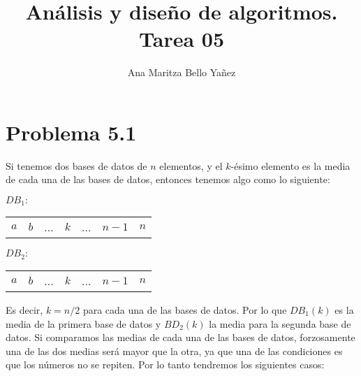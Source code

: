 \documentclass{article}
\begin{document}
\title{Análisis y diseño de algoritmos. \\ Tarea 05}
\author{Ana Maritza Bello Yañez}
\maketitle
\setlength{\parindent}{0pt}
\setlength{\parskip}{1em}

\section*{Problema 5.1}


Si tenemos dos bases de datos de $n$ elementos, y el $k$-ésimo elemento es la
media de cada una de las bases de datos, entonces tenemos algo como lo
siguiente:

\begin{center}
    $DB_1:$
    \begin{tabular}{c|c|c|c|c|c|c}
        $a$ & $b$ & ... & $k$ & ... & $n-1$ & $n$
    \end{tabular}
\end{center}

\begin{center}
    $DB_2:$
    \begin{tabular}{c|c|c|c|c|c|c}
        $a$ & $b$ & ... & $k$ & ... & $n-1$ & $n$
    \end{tabular}
\end{center}

Es decir, $k = n/2$ para cada una de las bases de datos. Por lo que $DB_1(k)$ es
la media de la primera base de datos y $BD_2(k)$ la media para la segunda base
de datos. Si comparamos las medias de cada una de las bases de datos,
forzosamente una de las dos medias será mayor que la otra, ya que una de las
condiciones es que los números no se repiten. Por lo tanto tendremos los
siguientes casos:
\end{document}
